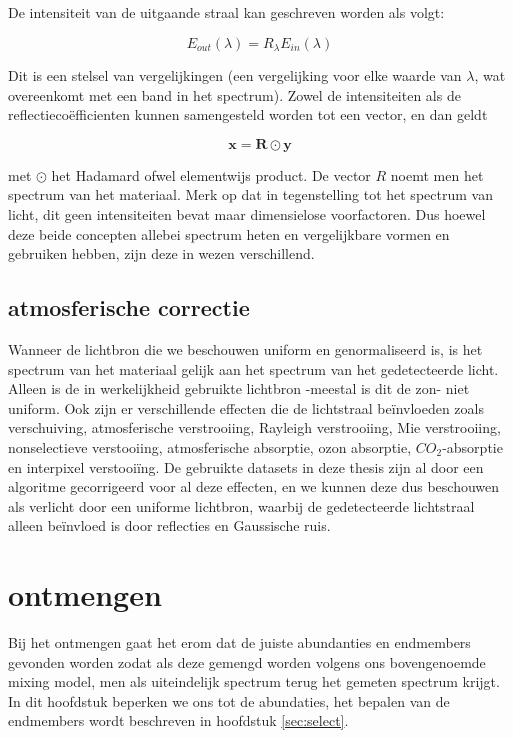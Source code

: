 \documentclass[12pt]{report}
\begin{document}
De intensiteit van de uitgaande straal kan geschreven worden als volgt:

\begin{equation}
E_{out}(\lambda) = R_\lambda E_{in}(\lambda)
\end{equation}

Dit is een stelsel van vergelijkingen (een vergelijking voor elke waarde van $\lambda$, wat overeenkomt met een band in het spectrum). Zowel de intensiteiten als de reflectieco\"efficienten kunnen samengesteld worden tot een vector, en dan geldt

\begin{equation}
\bm{x} = \bm{R}\odot \bm{y}
\end{equation}

met $\odot$ het Hadamard ofwel elementwijs product. De vector $R$ noemt men het spectrum van het materiaal. Merk op dat in tegenstelling tot het spectrum van licht, dit geen intensiteiten bevat maar dimensielose voorfactoren. Dus hoewel deze beide concepten allebei spectrum heten en vergelijkbare vormen en gebruiken hebben, zijn deze in wezen verschillend.


\subsection{atmosferische correctie}

Wanneer de lichtbron die we beschouwen uniform en genormaliseerd is, is het spectrum van het materiaal gelijk aan het spectrum van het gedetecteerde licht. Alleen is de in werkelijkheid gebruikte lichtbron -meestal is dit de zon- niet uniform. Ook zijn er verschillende effecten die de lichtstraal be\"invloeden\cite{fun} zoals verschuiving, atmosferische verstrooiing, Rayleigh verstrooiing, Mie verstrooiing, nonselectieve verstooiing, atmosferische absorptie, ozon absorptie, $CO_2$-absorptie en interpixel verstooi\"ing. De gebruikte datasets in deze thesis zijn al door een algoritme gecorrigeerd voor al deze effecten, en we kunnen deze dus beschouwen als verlicht door een uniforme lichtbron, waarbij de gedetecteerde lichtstraal alleen be\"invloed is door reflecties en Gaussische ruis. 

\section{ontmengen}

Bij het ontmengen gaat het erom dat de juiste abundanties en endmembers gevonden worden zodat als deze gemengd worden volgens ons bovengenoemde mixing model, men als uiteindelijk spectrum terug het gemeten spectrum krijgt. In dit hoofdstuk beperken we ons tot de abundaties, het bepalen van de endmembers wordt beschreven in hoofdstuk \ref{sec:select}.
\end{document}
